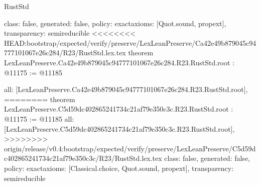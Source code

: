 \begin{lexlean}{RustStd}
\begin{coremodule}
{\begin{coremodule}
{{{{{{{{{{{{{{  class: false,
  generated: false,
  policy: exact{axioms: [Quot.sound, propext]},
  transparency: semireducible
}
<<<<<<<< HEAD:bootstrap/expected/verify/preserve/LexLeanPreserve/Ca42e49b879045c94777101067e26c284/R23/RustStd.lex.tex
theorem LexLeanPreserve.Ca42e49b879045c94777101067e26c284.R23.RustStd.root : @11175 := @11185 {
  all: [LexLeanPreserve.Ca42e49b879045c94777101067e26c284.R23.RustStd.root],
========
theorem LexLeanPreserve.C5d59dc402865241734c21af79e350c3c.R23.RustStd.root : @11175 := @11185 {
  all: [LexLeanPreserve.C5d59dc402865241734c21af79e350c3c.R23.RustStd.root],
>>>>>>>> origin/release/v0.4:bootstrap/expected/verify/preserve/LexLeanPreserve/C5d59dc402865241734c21af79e350c3c/R23/RustStd.lex.tex
  class: false,
  generated: false,
  policy: exact{axioms: [Classical.choice, Quot.sound, propext]},
  transparency: semireducible
}

}}}}}}}}}}}}}}
\end{coremodule}}
\end{coremodule}
\end{lexlean}
